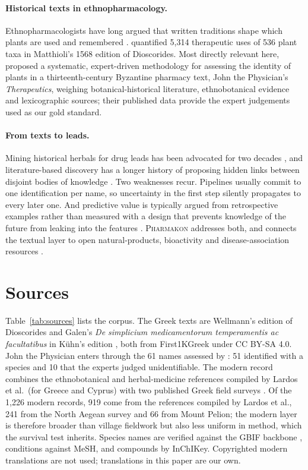 \documentclass[11pt,a4paper]{article}
\newcommand{\pkm}{\textsc{Pharmakon}}
\begin{document}
\paragraph{Historical texts in ethnopharmacology.} Ethnopharmacologists have long argued that written traditions shape which plants are used and remembered \citep{leonti2011}. \citet{staub2016} quantified 5,314 therapeutic uses of 536 plant taxa in Matthioli’s 1568 edition of Dioscorides. Most directly relevant here, \citet{lardos2024} proposed a systematic, expert-driven methodology for assessing the identity of plants in a thirteenth-century Byzantine pharmacy text, John the Physician’s \textit{Therapeutics}, weighing botanical-historical literature, ethnobotanical evidence and lexicographic sources; their published data \citep{lardos2023data} provide the expert judgements used as our gold standard.

\paragraph{From texts to leads.} Mining historical herbals for drug leads has been advocated for two decades \citep{buenz2004}, and literature-based discovery has a longer history of proposing hidden links between disjoint bodies of knowledge \citep{swanson1986}. Two weaknesses recur. Pipelines usually commit to one identification per name, so uncertainty in the first step silently propagates to every later one. And predictive value is typically argued from retrospective examples rather than measured with a design that prevents knowledge of the future from leaking into the features \citep{kaufman2012}. \pkm{} addresses both, and connects the textual layer to open natural-products, bioactivity and disease-association resources \citep{rutz2022,zdrazil2024,buniello2025}.

\section{Sources}

Table~\ref{tab:sources} lists the corpus. The Greek texts are Wellmann’s edition of Dioscorides \citep{wellmann1907} and Galen’s \textit{De simplicium medicamentorum temperamentis ac facultatibus} in Kühn’s edition \citep{kuhn1826}, both from First1KGreek under CC BY-SA 4.0. John the Physician enters through the 61 names assessed by \citet{lardos2024}: 51 identified with a species and 10 that the experts judged unidentifiable. The modern record combines the ethnobotanical and herbal-medicine references compiled by Lardos et al.\ (for Greece and Cyprus) with two published Greek field surveys \citep{tsioutsiou2023,axiotis2018}. Of the 1,226 modern records, 919 come from the references compiled by Lardos et al., 241 from the North Aegean survey and 66 from Mount Pelion; the modern layer is therefore broader than village fieldwork but also less uniform in method, which the survival test inherits. Species names are verified against the GBIF backbone \citep{gbif2023}, conditions against MeSH, and compounds by InChIKey. Copyrighted modern translations are not used; translations in this paper are our own.
\end{document}
